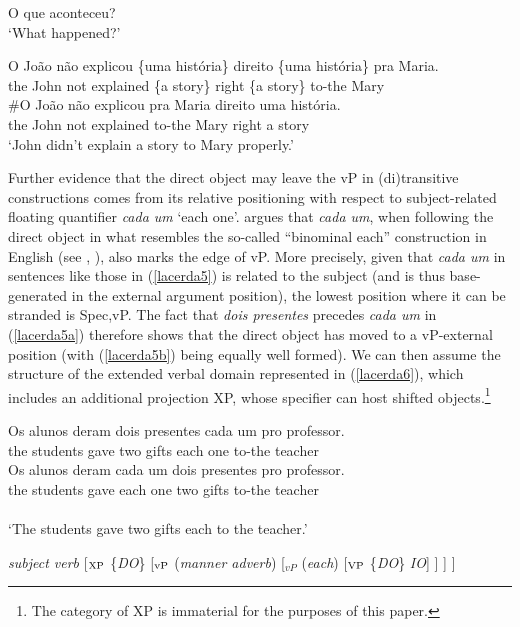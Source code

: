 \documentclass[output=paper]{langscibook}
\begin{document}
\begin{exe}
\ex \label{lacerda4}
 \begin{xlist}
 \label{lacerda4A}
O que aconteceu?\\
`What happened?'

 \label{lacerda4B1}
\gll O João não explicou \{uma história\} direito \{uma	história\} pra Maria.\\
the John not explained \{a story\} right \{a story\} to-the Mary\\

 \label{lacerda4B2}
\gll \#O João não explicou pra Maria direito uma história.\\
the	John not explained to-the Mary right a story\\
\glt ‘John didn’t explain a story to Mary properly.’

    \end{xlist}
\end{exe}

Further evidence that the direct object may leave the vP in (di)transitive constructions comes from its relative positioning with respect to subject-related floating quantifier \emph{cada um} ‘each one’. \citet{Lacerda2012,Lacerda2016a} argues that \emph{cada um}, when following the direct object in what resembles the so-called “binominal each” construction in English (see \citealt{SafirStowell1988}, \citealt{Stowell2013}), also marks the edge of vP. More precisely, given that \emph{cada um} in sentences like those in (\ref{lacerda5}) is related to the subject (and is thus base-generated in the external argument position), the lowest position where it can be stranded is Spec,vP. The fact that \emph{dois presentes} precedes \emph{cada um} in (\ref{lacerda5a}) therefore shows that the direct object has moved to a vP-external position (with (\ref{lacerda5b}) being equally well formed). We can then assume the structure of the extended verbal domain represented in (\ref{lacerda6}), which includes an additional projection XP, whose specifier can host shifted objects.\footnote{The category of XP is immaterial for the purposes of this paper.} 

\begin{exe}
\ex \label{lacerda5}
\begin{xlist}
\ex \label{lacerda5a}
\gll Os alunos deram dois presentes cada um pro professor.\\
the students gave two gifts	each	one	to-the teacher\\

\ex \label{lacerda5b}
\gll Os alunos deram cada um dois presentes pro professor.\\
the students	gave each one	two	gifts to-the teacher\\\\
‘The students gave two gifts each to the teacher.’
\end{xlist}

\ex \label{lacerda6} \emph{subject verb} [$_{\textnormal{XP}}$ \{\emph{DO}\} [$_{\textnormal{vP}}$ (\emph{manner adverb}) [$_{vP}$ (\emph{each}) [$_{\textnormal{VP}}$ \{\emph{DO}\} \emph{IO}] ] ] ]
\end{exe}
\end{document}
